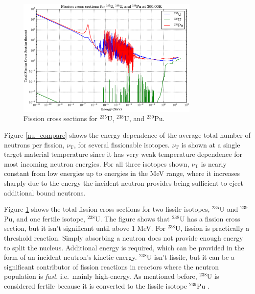 \begin{figure}[h!]
  \centering
    \includegraphics[width=0.8\textwidth]{graphics/xs_fissile.eps}
     \caption{Fission cross sections for $^{235}$U, $^{238}$U, and  $^{239}$Pu. \label{xs_fission_only}}
\end{figure}

Figure \ref{nu_compare} shows the energy dependence of the average total number of neutrons per fission, $\nu_\mathrm{T}$, for several fissionable isotopes.  $\nu_\mathrm{T}$ is shown at a single target material temperature since it has very weak temperature dependence for most incoming neutron energies.   For all three isotopes shown, $\nu_\mathrm{T}$ is nearly constant from low energies up to energies in the MeV range, where it increases sharply due to the energy the incident neutron provides being sufficient to eject additional bound neutrons.  


Figure \ref{xs_fission_only} shows the total fission cross sections for two fissile isotopes, $^{235}$U and $^{239}$Pu, and one fertile isotope, $^{238}$U.  The figure shows that  $^{238}$U has a fission cross section, but it isn't significant until above 1 MeV.  For $^{238}$U, fission is practically a threshold reaction.  Simply absorbing a neutron does not provide enough energy to split the nucleus.  Additional energy is required, which can be provided in the form of an incident neutron's kinetic energy.  $^{238}$U isn't fissile, but it can be a significant contributor of fission reactions in reactors where the neutron population is \emph{fast}, i.e.\ mainly high-energy.  As mentioned before, $^{238}$U is considered fertile because it is converted to the fissile isotope $^{239}$Pu \cite{duderstadt}.  
  
